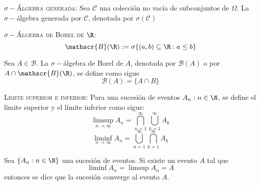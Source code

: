 \begin{definicion}
	{\scshape $\sigma -$Álgebra generada: } Sea $\mathscr{C}$ una colección no vacía de subconjuntos de $\Omega$. La $\sigma -$álgebra generada por $\mathscr{C}$, denotada por $\sigma (\mathscr{C})$
\end{definicion}

\begin{definicion}
	{\scshape $\sigma -$Álgebra de Borel de $\R$: } 
	$$\mathscr{B} (\R) := \sigma \{ (a,b) \subseteq \R:a\leq b \}$$
\end{definicion}

\begin{definicion}
	Sea $A \in \mathscr{B}$. La $\sigma -$álgebra de Borel de $A$, denotada por $\mathscr{B} (A)$  o por $A\cap \mathscr{B} (\R)$, se define como sigue
		$$\mathscr{B} (A) = \{ A\cap B \}$$
\end{definicion}

\begin{definicion}
	{\scshape Límite superior e inferior: } Para una sucesión de eventos $A_n : n\in \N$, se define el límite superior y el límite inferior como sigue:
	 	$$\limsup _{n\to \infty} A_n = \bigcap _{n=1} ^\infty \bigcup _{k=1} ^\infty A_k$$
	 	$$\liminf _{n\to \infty} A_n = \bigcup _{n=1} ^\infty \bigcap _{k=1} ^\infty A_k$$
\end{definicion}

\begin{definicion}
	Sea $\{ A_n : n\in \N \}$ una sucesión de eventos. Si existe un evento $A$ tal que
		$$\liminf A_n = \limsup A_n = A$$
	entonces se dice que la sucesión converge al evento $A$.
\end{definicion}
















































